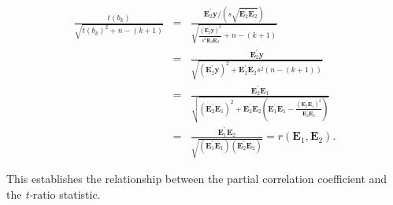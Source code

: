\begin{center}
\begin{eqnarray*}
\frac{t(b_{k})}{\sqrt{t(b_{k})^2+n-(k+1)}} &=&\frac{\mathbf{E}
_2^{\prime} \mathbf{y} / \left(
s\sqrt{\mathbf{E}_2^{\prime}\mathbf{E}_2}\right) }
{\sqrt{\frac{\left( \mathbf{E}_2^{\prime} \mathbf{y}\right) ^2}
{s^2\mathbf{E}_2^{\prime}\mathbf{E}_2}+n-(k+1)}} \\
&=&\frac{\mathbf{E}_2^{\prime}\mathbf{y}}{\sqrt{\left(
\mathbf{E}_2^{\prime}\mathbf{y}\right) ^2+\mathbf{E}_2^{\prime}
\mathbf{E}_2 s^2\left( n-(k+1)\right) }} \\
&=&\frac{\mathbf{E}_2^{\prime}\mathbf{E}_1} {\sqrt{\left(
\mathbf{E}_2^{\prime}\mathbf{E}_1\right)^2 +
\mathbf{E}_2^{\prime}\mathbf{E}_2\left( \mathbf{E}_1^{\prime}
\mathbf{E}_1 - \frac{\left( \mathbf{E}_2^{\prime}\mathbf{E}_1\right)
^2}{\mathbf{E}_2^{\prime}\mathbf{E}_2}
\right) }} \\
&=&\frac{\mathbf{E}_1^{\prime}\mathbf{E}_2}{\sqrt{(\mathbf{E}_1^{\prime}\mathbf{E}_1)
(\mathbf{E}_2^{\prime} \mathbf{E}_2)}} =
r(\mathbf{E}_1,\mathbf{E}_2) .
\end{eqnarray*}
\end{center}
This establishes the relationship between the partial correlation
coefficient and the \textit{t-}ratio statistic.

